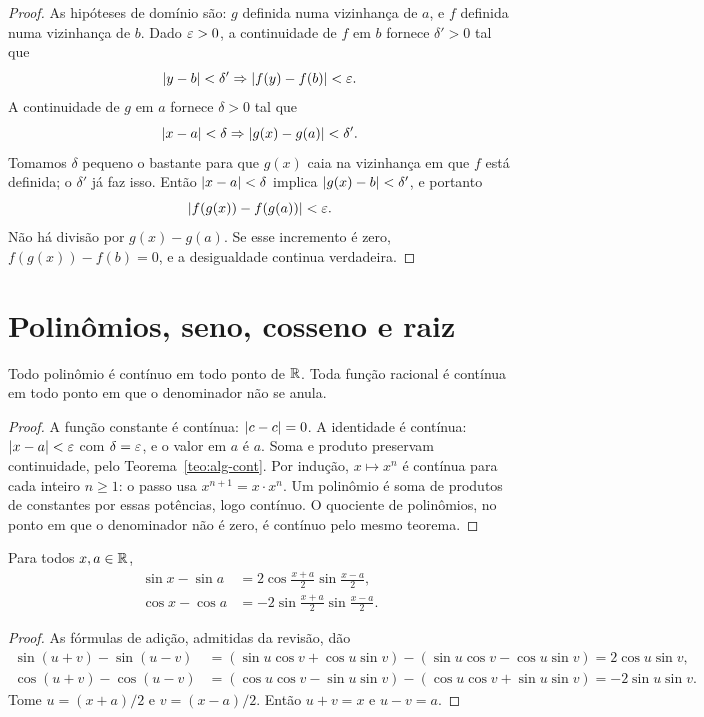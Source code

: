 \documentclass[11pt,a4paper]{article}
\begin{document}
\begin{proof}
As hip\'oteses de dom\'inio s\~ao: $g$ definida numa vizinhan\c{c}a de $a$, e $f$ definida numa vizinhan\c{c}a de $b$. Dado $\varepsilon>0$, a continuidade de $f$ em $b$ fornece $\delta'>0$ tal que
\[
\left\lvert y-b \right\rvert<\delta' \Rightarrow \left\lvert f(y)-f(b) \right\rvert<\varepsilon.
\]
A continuidade de $g$ em $a$ fornece $\delta>0$ tal que
\[
\left\lvert x-a \right\rvert<\delta \Rightarrow \left\lvert g(x)-g(a) \right\rvert<\delta'.
\]
Tomamos $\delta$ pequeno o bastante para que $g(x)$ caia na vizinhan\c{c}a em que $f$ est\'a definida; o $\delta'$ j\'a faz isso. Ent\~ao $\left\lvert x-a \right\rvert<\delta$ implica $\left\lvert g(x)-b \right\rvert<\delta'$, e portanto
\[
\left\lvert f(g(x))-f(g(a)) \right\rvert<\varepsilon.
\]
N\~ao h\'a divis\~ao por $g(x)-g(a)$. Se esse incremento \'e zero, $f(g(x))-f(b)=0$, e a desigualdade continua verdadeira.
\end{proof}

\section{Polin\^omios, seno, cosseno e raiz}
\label{sec:exemplos-cont}

\begin{teorema}
\label{teo:pol-cont}
Todo polin\^omio \'e cont\'inuo em todo ponto de $\mathbb{R}$. Toda fun\c{c}\~ao racional \'e cont\'inua em todo ponto em que o denominador n\~ao se anula.
\end{teorema}

\begin{proof}
A fun\c{c}\~ao constante \'e cont\'inua: $\left\lvert c-c \right\rvert=0$. A identidade \'e cont\'inua: $\left\lvert x-a \right\rvert<\varepsilon$ com $\delta=\varepsilon$, e o valor em $a$ \'e $a$. Soma e produto preservam continuidade, pelo Teorema~\ref{teo:alg-cont}. Por indu\c{c}\~ao, $x\mapsto x^n$ \'e cont\'inua para cada inteiro $n\ge 1$: o passo usa $x^{n+1}=x\cdot x^n$. Um polin\^omio \'e soma de produtos de constantes por essas pot\^encias, logo cont\'inuo. O quociente de polin\^omios, no ponto em que o denominador n\~ao \'e zero, \'e cont\'inuo pelo mesmo teorema.
\end{proof}

\begin{lema}
\label{lem:prosta}
Para todos $x,a\in\mathbb{R}$,
\begin{align*}
\sin x-\sin a &= 2\cos\frac{x+a}{2}\sin\frac{x-a}{2},\\
\cos x-\cos a &= -2\sin\frac{x+a}{2}\sin\frac{x-a}{2}.
\end{align*}
\end{lema}

\begin{proof}
As f\'ormulas de adi\c{c}\~ao, admitidas da revis\~ao, d\~ao
\begin{align*}
\sin(u+v)-\sin(u-v)
&=(\sin u\cos v+\cos u\sin v)-(\sin u\cos v-\cos u\sin v)
=2\cos u\sin v,\\
\cos(u+v)-\cos(u-v)
&=(\cos u\cos v-\sin u\sin v)-(\cos u\cos v+\sin u\sin v)
=-2\sin u\sin v.
\end{align*}
Tome $u=(x+a)/2$ e $v=(x-a)/2$. Ent\~ao $u+v=x$ e $u-v=a$.
\end{proof}
\end{document}
